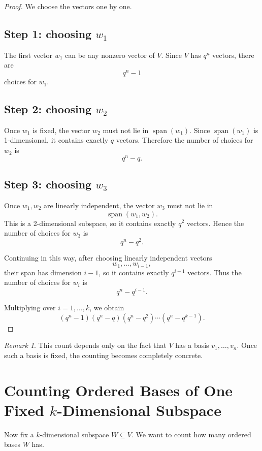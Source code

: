 \documentclass[11pt]{article}
\theoremstyle{definition}
\theoremstyle{remark}
\newtheorem{remark}[theorem]{Remark}
\newcommand{\Span}{\operatorname{span}}
\begin{document}
	\begin{proof}
		We choose the vectors one by one.
		
		\subsection*{Step 1: choosing \(w_1\)}
		The first vector \(w_1\) can be any nonzero vector of \(V\). Since \(V\) has \(q^n\) vectors, there are
		\[
		q^n-1
		\]
		choices for \(w_1\).
		
		\subsection*{Step 2: choosing \(w_2\)}
		Once \(w_1\) is fixed, the vector \(w_2\) must not lie in \(\Span(w_1)\). Since \(\Span(w_1)\) is 1-dimensional, it contains exactly \(q\) vectors. Therefore the number of choices for \(w_2\) is
		\[
		q^n-q.
		\]
		
		\subsection*{Step 3: choosing \(w_3\)}
		Once \(w_1,w_2\) are linearly independent, the vector \(w_3\) must not lie in
		\[
		\Span(w_1,w_2).
		\]
		This is a 2-dimensional subspace, so it contains exactly \(q^2\) vectors. Hence the number of choices for \(w_3\) is
		\[
		q^n-q^2.
		\]
		
		Continuing in this way, after choosing linearly independent vectors
		\[
		w_1,\dots,w_{i-1},
		\]
		their span has dimension \(i-1\), so it contains exactly \(q^{i-1}\) vectors. Thus the number of choices for \(w_i\) is
		\[
		q^n-q^{i-1}.
		\]
		
		Multiplying over \(i=1,\dots,k\), we obtain
		\[
		(q^n-1)(q^n-q)(q^n-q^2)\cdots(q^n-q^{k-1}).
		\]
	\end{proof}
	
	\begin{remark}
		This count depends only on the fact that \(V\) has a basis \(v_1,\dots,v_n\). Once such a basis is fixed, the counting becomes completely concrete.
	\end{remark}
	
	\section{Counting Ordered Bases of One Fixed \(k\)-Dimensional Subspace}
	
	Now fix a \(k\)-dimensional subspace \(W\subseteq V\). We want to count how many ordered bases \(W\) has.
	
\end{document}
